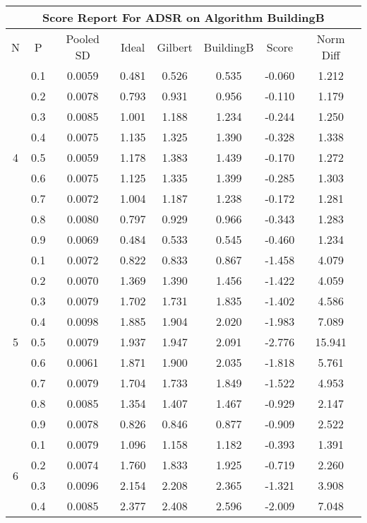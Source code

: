 \documentclass[11pt,a4paper]{report}
\begin{document}
\begin{longtable}{ | c | c || c | c | c | c | c | c | }
\hline
\multicolumn{8}{|c|}{ Score Report For ADSR on Algorithm BuildingB} \\
\hline
N & P & Pooled SD &  Ideal &  Gilbert & BuildingB  & Score & Norm Diff \\
 \hline
 \hline
 \endhead
\multirow{9}{*}{4} & 0.1 & 0.0059 & 0.481 & 0.526 & 0.535 & -0.060 & 1.212 \\
 & 0.2 & 0.0078 & 0.793 & 0.931 & 0.956 & -0.110 & 1.179 \\
 & 0.3 & 0.0085 & 1.001 & 1.188 & 1.234 & -0.244 & 1.250 \\
 & 0.4 & 0.0075 & 1.135 & 1.325 & 1.390 & -0.328 & 1.338 \\
 & 0.5 & 0.0059 & 1.178 & 1.383 & 1.439 & -0.170 & 1.272 \\
 & 0.6 & 0.0075 & 1.125 & 1.335 & 1.399 & -0.285 & 1.303 \\
 & 0.7 & 0.0072 & 1.004 & 1.187 & 1.238 & -0.172 & 1.281 \\
 & 0.8 & 0.0080 & 0.797 & 0.929 & 0.966 & -0.343 & 1.283 \\
 & 0.9 & 0.0069 & 0.484 & 0.533 & 0.545 & -0.460 & 1.234 \\
 \hline
\multirow{9}{*}{5} & 0.1 & 0.0072 & 0.822 & 0.833 & 0.867 & -1.458 & 4.079 \\
 & 0.2 & 0.0070 & 1.369 & 1.390 & 1.456 & -1.422 & 4.059 \\
 & 0.3 & 0.0079 & 1.702 & 1.731 & 1.835 & -1.402 & 4.586 \\
 & 0.4 & 0.0098 & 1.885 & 1.904 & 2.020 & -1.983 & 7.089 \\
 & 0.5 & 0.0079 & 1.937 & 1.947 & 2.091 & -2.776 & 15.941 \\
 & 0.6 & 0.0061 & 1.871 & 1.900 & 2.035 & -1.818 & 5.761 \\
 & 0.7 & 0.0079 & 1.704 & 1.733 & 1.849 & -1.522 & 4.953 \\
 & 0.8 & 0.0085 & 1.354 & 1.407 & 1.467 & -0.929 & 2.147 \\
 & 0.9 & 0.0078 & 0.826 & 0.846 & 0.877 & -0.909 & 2.522 \\
 \hline
\multirow{9}{*}{6} & 0.1 & 0.0079 & 1.096 & 1.158 & 1.182 & -0.393 & 1.391 \\
 & 0.2 & 0.0074 & 1.760 & 1.833 & 1.925 & -0.719 & 2.260 \\
 & 0.3 & 0.0096 & 2.154 & 2.208 & 2.365 & -1.321 & 3.908 \\
 & 0.4 & 0.0085 & 2.377 & 2.408 & 2.596 & -2.009 & 7.048 \\

\end{longtable}
\end{document}
